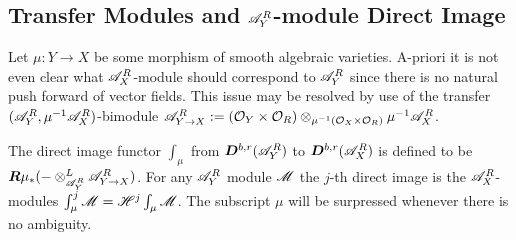     \subsection{Transfer Modules and $\mathscr{A}_Y^R$-module Direct Image}
    Let $\mu:Y\to X$ be some morphism of smooth algebraic varieties.  A-priori it is not even clear what $\mathscr{A}_X^R$-module should correspond to $\mathscr{A}_Y^R$ since there is no natural push forward of vector fields. This issue may be resolved by use of the transfer $(\mathscr{A}_Y^R,\mu^{-1}\mathscr{A}_X^R)$-bimodule $\mathscr{A}_{Y\to X}^R:= (\mathcal{O}_Y\times \mathcal{O}_R) \otimes_{\mu^{-1}(\mathcal{O}_X\times \mathcal{O}_R)}\mu^{-1}\mathscr{A}_X^R$.

    \begin{definition}
      The direct image functor $\int_\mu$ from $\boldsymbol{D}^{b,r}(\mathscr{A}_Y^R)$ to $\boldsymbol{D}^{b,r}(\mathscr{A}_X^R)$ is defined to be $\boldsymbol{R}\mu_* ({-}\otimes_{\mathscr{A}_Y^R}^L \mathscr{A}_{Y\to X}^R)$.
      For any $\mathscr{A}_Y^R$ module $\mathscr{M}$ the $j$-th direct image is the $\mathscr{A}_X^R$-modules $\int_\mu^j \mathscr{M} = \mathscr{H}^j \int_\mu \mathscr{M}$.
      The subscript $\mu$ will be surpressed whenever there is no ambiguity.
    \end{definition}

